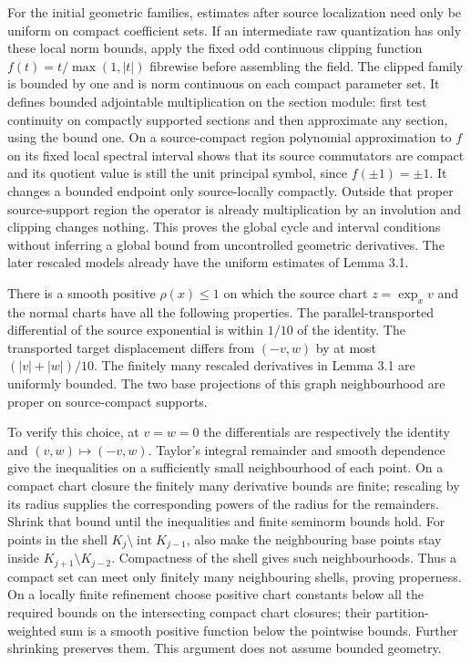 \documentclass[
  11pt,
]{article}
\begin{document}
For the initial geometric families, estimates after source localization
need only be uniform on compact coefficient sets. If an intermediate raw
quantization has only these local norm bounds, apply the fixed odd
continuous clipping function \(f(t)=t/\max(1,|t|)\) fibrewise before
assembling the field. The clipped family is bounded by one and is norm
continuous on each compact parameter set. It defines bounded adjointable
multiplication on the section module: first test continuity on compactly
supported sections and then approximate any section, using the bound
one. On a source-compact region polynomial approximation to \(f\) on its
fixed local spectral interval shows that its source commutators are
compact and its quotient value is still the unit principal symbol, since
\(f(\pm1)=\pm1\). It changes a bounded endpoint only source-locally
compactly. Outside that proper source-support region the operator is
already multiplication by an involution and clipping changes nothing.
This proves the global cycle and interval conditions without inferring a
global bound from uncontrolled geometric derivatives. The later rescaled
models already have the uniform estimates of Lemma 3.1.

There is a smooth positive \(\rho(x)\leq1\) on which the source chart
\(z=\exp_x v\) and the normal charts have all the following properties.
The parallel-transported differential of the source exponential is
within \(1/10\) of the identity. The transported target displacement
differs from \((-v,w)\) by at most \((|v|+|w|)/10\). The finitely many
rescaled derivatives in Lemma 3.1 are uniformly bounded. The two base
projections of this graph neighbourhood are proper on source-compact
supports.

To verify this choice, at \(v=w=0\) the differentials are respectively
the identity and \((v,w)\mapsto(-v,w)\). Taylor's integral remainder and
smooth dependence give the inequalities on a sufficiently small
neighbourhood of each point. On a compact chart closure the finitely
many derivative bounds are finite; rescaling by its radius supplies the
corresponding powers of the radius for the remainders. Shrink that bound
until the inequalities and finite seminorm bounds hold. For points in
the shell \(K_j\setminus\operatorname{int}K_{j-1}\), also make the
neighbouring base points stay inside \(K_{j+1}\setminus K_{j-2}\).
Compactness of the shell gives such neighbourhoods. Thus a compact set
can meet only finitely many neighbouring shells, proving properness. On
a locally finite refinement choose positive chart constants below all
the required bounds on the intersecting compact chart closures; their
partition-weighted sum is a smooth positive function below the pointwise
bounds. Further shrinking preserves them. This argument does not assume
bounded geometry.
\end{document}
